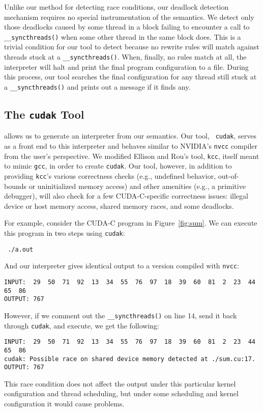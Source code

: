Unlike our method for detecting race conditions, our deadlock detection
mechanism requires no special instrumentation of the semantics. We detect only
those deadlocks caused by some thread in a block failing to encounter a call to
{\tt \_\_syncthreads()} when some other thread in the same block does. This is a
trivial condition for our tool to detect because no rewrite rules will match
against threads stuck at a {\tt \_\_syncthreads()}. When, finally, no rules
match at all, the interpreter will halt and print the final program
configuration to a file. During this process, our tool searches the final
configuration for any thread still stuck at a {\tt \_\_syncthreads()} and prints
out a message if it finds any.

\subsection{The {\tt cudak} Tool}
\K allows us to generate an interpreter from our semantics. Our tool, {\tt
cudak}, serves as a front end to this interpreter and behaves similar to
NVIDIA's {\tt nvcc} compiler from the user's perspective. We modified Ellison
and Rou's tool, {\tt kcc}, itself meant to mimic {\tt gcc}, in order to
create {\tt cudak}. Our tool, however, in addition to providing {\tt kcc}'s
various correctness checks (e.g., undefined behavior, out-of-bounds or
uninitialized memory access) and other \K amenities (e.g., a primitive
debugger), will also check for a few CUDA-C-specific correctness issues: illegal
device or host memory access, shared memory races, and some deadlocks.

For example, consider the CUDA-C program in Figure~\ref{fig:sum}. We can execute
this program in two steps using {\tt cudak}:
\begin{verbatim}
 ./a.out
\end{verbatim}
And our interpreter gives identical output to a version compiled with {\tt nvcc}:
\begin{verbatim}
INPUT:  29  50  71  92  13  34  55  76  97  18  39  60  81  2  23  44  65  86
OUTPUT: 767
\end{verbatim}
However, if we comment out the {\tt \_\_syncthreads()} on line 14, send it back
through {\tt cudak}, and execute, we get the following:
\begin{verbatim}
INPUT:  29  50  71  92  13  34  55  76  97  18  39  60  81  2  23  44  65  86
cudak: Possible race on shared device memory detected at ./sum.cu:17.
OUTPUT: 767
\end{verbatim}
This race condition does not affect the output under this particular kernel
configuration and thread scheduling, but under some scheduling and kernel
configuration it would cause problems.


